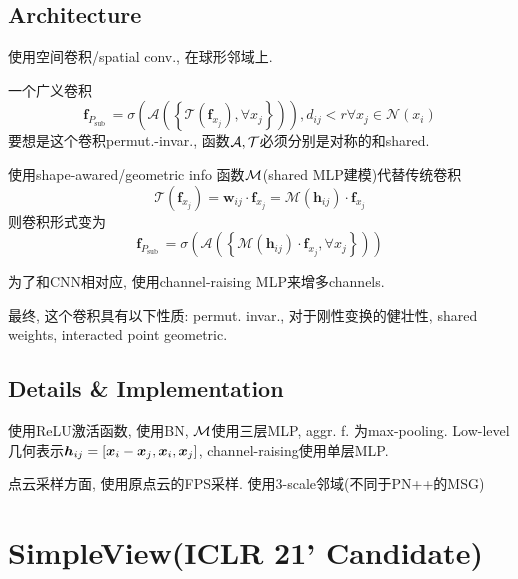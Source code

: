 \documentclass{article}
\begin{document}
\subsection{Architecture}
\begin{flushleft}
    \begin{idea}
        使用空间卷积/spatial conv., 在球形邻域上.
    \end{idea}

    一个广义卷积
    \begin{equation}
        \mathbf{f}_{P_{\text {sub }}}=\sigma\left(\mathcal{A}\left(\left\{\mathcal{T}\left(\mathbf{f}_{x_{j}}\right), \forall x_{j}\right\}\right)\right), d_{i j}<r \forall x_{j} \in \mathcal{N}\left(x_{i}\right)
    \end{equation}
    要想是这个卷积permut.-invar., 函数$\cal{A, T}$必须分别是对称的和shared.

    使用shape-awared/geometric info 函数$\cal M$(shared MLP建模)代替传统卷积
    \begin{equation}
        \mathcal{T}\left(\mathbf{f}_{x_{j}}\right)=\mathbf{w}_{i j} \cdot \mathbf{f}_{x_{j}}=\mathcal{M}\left(\mathbf{h}_{i j}\right) \cdot \mathbf{f}_{x_{j}}
    \end{equation}
    则卷积形式变为
    \begin{equation}
        \mathbf{f}_{P_{\text {sub }}}=\sigma\left(\mathcal{A}\left(\left\{\mathcal{M}\left(\mathbf{h}_{i j}\right) \cdot \mathbf{f}_{x_{j}}, \forall x_{j}\right\}\right)\right)
    \end{equation}

    为了和CNN相对应, 使用channel-raising MLP来增多channels.

    最终, 这个卷积具有以下性质: permut. invar., 对于刚性变换的健壮性, shared weights, interacted point geometric.
\end{flushleft}
\subsection{Details \& Implementation}
\begin{flushleft}
    使用ReLU激活函数, 使用BN, $\cal M$使用三层MLP, aggr. f. 为max-pooling. Low-level几何表示$\bs h_{ij}=[\bs x_i-\bs x_j, \bs x_i, \bs x_j]$, channel-raising使用单层MLP.

    点云采样方面, 使用原点云的FPS采样. 使用3-scale邻域(不同于PN++的MSG)
\end{flushleft}
\section{SimpleView(ICLR 21' Candidate)}
\end{document}
